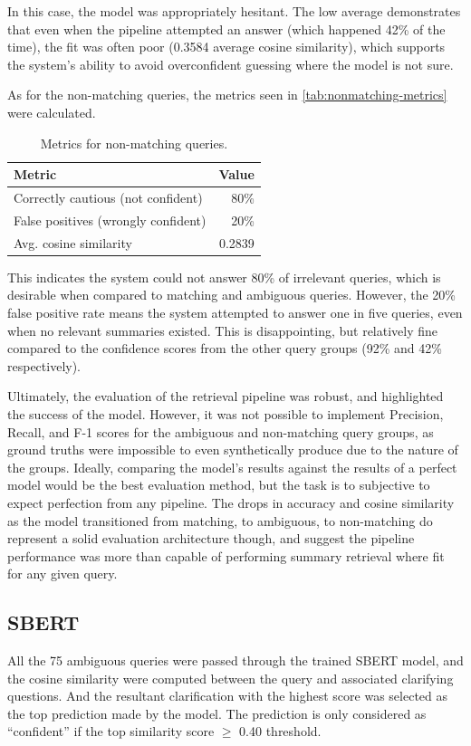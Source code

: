 \documentclass[11pt]{article}
\begin{document}
In this case, the model was appropriately hesitant. The low average demonstrates that even when the pipeline attempted an answer (which happened 42\% of the time), the fit was often poor (0.3584 average cosine similarity), which supports the system's ability to avoid overconfident guessing where the model is not sure. 

As for the non-matching queries, the metrics seen in \autoref{tab:nonmatching-metrics} were calculated.

\begin{table}[t]
  \centering
  \begin{tabular}{l r}
    \textbf{Metric} & \textbf{Value} \\
    \hline
    Correctly cautious (not confident) & 80\% \\
    False positives (wrongly confident) & 20\% \\
    Avg. cosine similarity & 0.2839 \\
  \end{tabular}
  \caption{Metrics for non-matching queries.}
  \label{tab:nonmatching-metrics}
\end{table}

This indicates the system could not answer 80\% of irrelevant queries, which is desirable when compared to matching and ambiguous queries. However, the 20\% false positive rate means the system attempted to answer one in five queries, even when no relevant summaries existed. This is disappointing, but relatively fine compared to the confidence scores from the other query groups (92\% and 42\% respectively).

Ultimately, the evaluation of the retrieval pipeline was robust, and highlighted the success of the model. However, it was not possible to implement Precision, Recall, and F-1 scores for the ambiguous and non-matching query groups, as ground truths were impossible to even synthetically produce due to the nature of the groups. Ideally, comparing the model's results against the results of a perfect model would be the best evaluation method, but the task is to subjective to expect perfection from any pipeline. The drops in accuracy and cosine similarity as the model transitioned from matching, to ambiguous, to non-matching do represent a solid evaluation architecture though, and suggest the pipeline performance was more than capable of performing summary retrieval where fit for any given query.

\subsection{SBERT}
All the 75 ambiguous queries were passed through the trained SBERT model, and the cosine similarity were computed between the query and associated clarifying questions. And the resultant clarification with the highest score was selected as the top prediction made by the model. The prediction is only considered as “confident” if the top similarity score $\geq$ 0.40 threshold.
\end{document}
